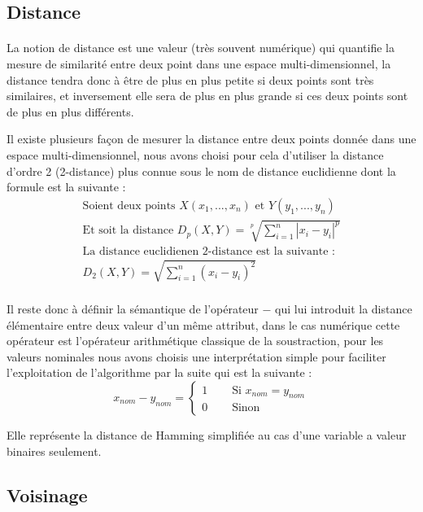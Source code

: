 		\subsection{Distance}\label{distance}
			\paragraph{}
			La notion de distance est une valeur (très souvent numérique) qui quantifie la mesure de similarité entre deux point dans une espace multi-dimensionnel, la distance tendra donc à être de plus en plus petite si deux points sont très similaires, et inversement elle sera de plus en plus grande si ces deux points sont de plus en plus différents.
			\par
			Il existe plusieurs façon de mesurer la distance entre deux points donnée dans une espace multi-dimensionnel, nous avons choisi pour cela d'utiliser la distance d'ordre 2 (2-distance) plus connue sous le nom de distance euclidienne dont la formule est la suivante : 
			\begin{gather*} 
				\text{Soient deux points } X(x_1,...,x_n) \text{ et } Y(y_1,...,y_n) \\
				\text{Et soit la distance }D_p(X,Y) = \sqrt[p]{\sum_{i=1}^{n} | x_i - y_i|^p} \\
				\text{La distance euclidienen 2-distance est la suivante : } \\
				D_2(X,Y) = \sqrt{\sum_{i=1}^{n} (x_i - y_i)^2} \\
			\end{gather*}
			\par
			Il reste donc à définir la sémantique de l'opérateur $-$ qui lui introduit la distance élémentaire entre deux valeur d'un même attribut, dans le cas numérique cette opérateur est l'opérateur arithmétique classique de la soustraction, pour les valeurs nominales nous avons choisis une interprétation simple pour faciliter l'exploitation de l'algorithme par la suite qui est la suivante : 
			\[ 
				x_{nom} - y_{nom} = 
				\begin{cases}
					1 & \quad\text{ Si } x_{nom} = y_{nom}\\
					0 & \quad\text{ Sinon }
				\end{cases}
			\] 
			\par Elle représente la distance de Hamming simplifiée au cas d'une variable a valeur binaires seulement.
		\subsection{Voisinage}

